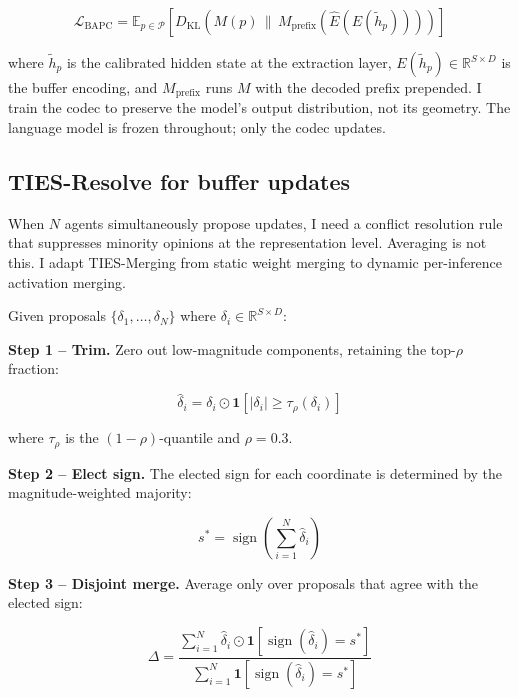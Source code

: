 \documentclass[10pt,twocolumn]{article}
\begin{document}
\begin{equation}
    \mathcal{L}_{\text{BAPC}} = \mathbb{E}_{p \in \mathcal{P}}\left[ D_{\text{KL}}\!\left( M(p) \,\|\, M_{\text{prefix}}(\hat{E}(E(\tilde{h}_p))) \right) \right]
    \label{eq:bapc_loss}
\end{equation}

where $\tilde{h}_p$ is the calibrated hidden state at the extraction layer, $E(\tilde{h}_p) \in \mathbb{R}^{S \times D}$ is the buffer encoding, and $M_{\text{prefix}}$ runs $M$ with the decoded prefix prepended. I train the codec to preserve the model's output distribution, not its geometry. The language model is frozen throughout; only the codec updates.

\subsection{TIES-Resolve for buffer updates}

When $N$ agents simultaneously propose updates, I need a conflict resolution rule that suppresses minority opinions at the representation level. Averaging is not this. I adapt TIES-Merging \citep{tiesmerging2023} from static weight merging to dynamic per-inference activation merging.

Given proposals $\{\delta_1, \ldots, \delta_N\}$ where $\delta_i \in \mathbb{R}^{S \times D}$:

\textbf{Step 1 -- Trim.} Zero out low-magnitude components, retaining the top-$\rho$ fraction:

\begin{equation}
    \hat{\delta}_i = \delta_i \odot \mathbf{1}\!\left[|\delta_i| \geq \tau_\rho(\delta_i)\right]
    \label{eq:trim}
\end{equation}

where $\tau_\rho$ is the $(1-\rho)$-quantile and $\rho = 0.3$.

\textbf{Step 2 -- Elect sign.} The elected sign for each coordinate is determined by the magnitude-weighted majority:

\begin{equation}
    s^* = \operatorname{sign}\!\left(\sum_{i=1}^{N} \hat{\delta}_i\right)
    \label{eq:sign_elect}
\end{equation}

\textbf{Step 3 -- Disjoint merge.} Average only over proposals that agree with the elected sign:

\begin{equation}
    \Delta = \frac{\sum_{i=1}^{N} \hat{\delta}_i \odot \mathbf{1}\!\left[\operatorname{sign}(\hat{\delta}_i) = s^*\right]}{\sum_{i=1}^{N} \mathbf{1}\!\left[\operatorname{sign}(\hat{\delta}_i) = s^*\right]}
    \label{eq:disjoint_merge}
\end{equation}
\end{document}
